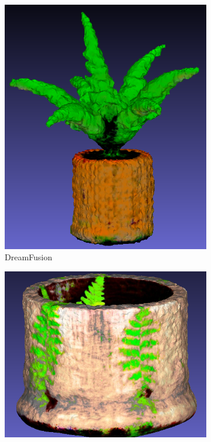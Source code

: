\begin{figure}[ht]
    \centering
    \small
    \begin{subfigure}[b]{0.24\textwidth}
        \centering
        \includegraphics[width=\textwidth]{etc/a high-quality rendering of a fern in a wooden pot/dreamfusion/dreamfusion_fern_result.png}
        \caption{DreamFusion}
        \vspace{0.1cm}
    \end{subfigure}
    \begin{subfigure}[b]{0.35\textwidth}
        \centering
        \includegraphics[width=\textwidth]{etc/a high-quality rendering of a fern in a wooden pot/magic3d/magic3d_fern_result.png}

\end{subfigure}
\end{figure}
